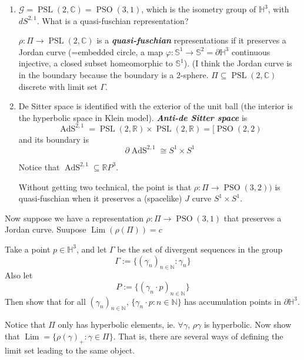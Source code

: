 \begin{enumerate}
	\item $\mathcal{G}=\operatorname{PSL}(2,\mathbb{C})=\operatorname{PSO}(3,1)$, which is the isometry group of $\mathbb{H}^3$, with $dS^{2,1}$. What is a quasi-fuschian representation?

		 \begin{defn}\leavevmode
			$\rho:\Pi\longrightarrow \operatorname{PSL}(2,\mathbb{C})$ is a \textit{\textbf{quasi-fuschian}} representations if it preserves a Jordan curve (=embedded circle, a map $\varphi:\mathbb{S}^1\longrightarrow \mathbb{S}^2=\partial \mathbb{H}^{3}$ continuous injective, a closed subset homeomorphic to $\mathbb{S}^1$). {\color{2}(I think the Jordan curve is in the boundary because the boundary is a 2-sphere.} $\Pi \subseteq \operatorname{PSL}(2,\mathbb{C})$ discrete with limit set $\Gamma$.
		\end{defn}

	\item De Sitter space is identified with the exterior of the unit ball (the interior is the hyperbolic space in Klein model). \textit{\textbf{Anti-de Sitter space}} is
		\[\operatorname{A d S}^{2,1}=\operatorname{PSL}(2,\mathbb{R})\times \operatorname{PSL}(2,\mathbb{R})=[\operatorname{PSO}(2,2)\]
		and its boundary is
		\[\partial \operatorname{A d S}^{2,1}\cong S^1\times S^1\]

		Notice that $\operatorname{AdS}^{2,1}\subseteq \mathbb{R}P^{3}$.

		Without getting two technical, the point is that $\rho:\Pi\longrightarrow \operatorname{PSO}(3,2))$ is quasi-fuschian when it preserves a (spacelike) $J$ curve $S^1\times S^1$.
\end{enumerate}


Now suppose we have a representation $\rho:\Pi\longrightarrow \operatorname{PSO}(3,1)$ that preserves a Jordan curve. Suupose $\operatorname{Lim}(\rho(\Pi))=c$

 \begin{exercise}\leavevmode
 	Take a point $p \in\mathbb{H}^{3}$, and let $\Gamma$ be the set of divergent sequences in the group
	\[\Gamma:=\{(\gamma_{n})_{ n \in\mathbb{N}}:\gamma_n\}\]
	Also let
	 \[P:=\{(\gamma_{n}\cdot p)_{n \in \mathbb{N}}\}\]
	 Then show that for all $(\gamma_{n})_{n \in \mathbb{N}}$, $\{\gamma_n\cdot p:n \in \mathbb{N}\}$ has accumulation points in $\partial \mathbb{H}^{3}$.
 \end{exercise}

\begin{exercise}\leavevmode
	Notice that $\Pi$ only has hyperbolic elements, ie. $\forall \gamma$, $\rho\gamma$ is hyperbolic. Now show that $\operatorname{Lim}=\{\rho(\gamma)_+:\gamma\in \Pi\}$. That is, there are several ways of defining the limit set leading to the same object.
\end{exercise}

